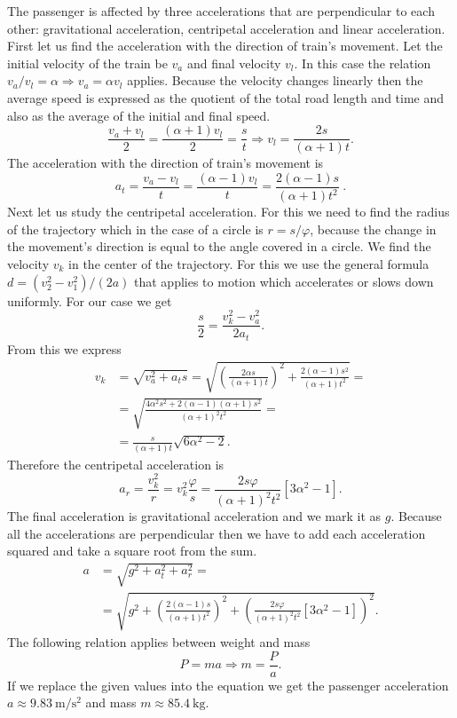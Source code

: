 \documentclass[11pt]{article}
\begin{document}

\solueng
The passenger is affected by three accelerations that are perpendicular to each other: gravitational acceleration, centripetal acceleration and linear acceleration. First let us find the acceleration with the direction of train’s movement. Let the initial velocity of the train be $v_a$ and final velocity $v_l$. In this case the relation $v_a/v_l=\alpha \Rightarrow v_a = \alpha v_l$ applies. Because the velocity changes linearly then the average speed is expressed as the quotient of the total road length and time and also as the average of the initial and final speed. 
\[ \frac{v_a + v_l}{2} = \frac{(\alpha + 1) v_l}{2} = \frac{s}{t} \Rightarrow v_l = \frac{2s}{(\alpha + 1)t}. \] 
The acceleration with the direction of train’s movement is
\[ a_t = \frac{v_a-v_l}{t} = \frac{(\alpha - 1) v_l}{t} = \frac{2(\alpha - 1)s}{(\alpha + 1)t^2} \ . \] 
Next let us study the centripetal acceleration. For this we need to find the radius of the trajectory which in the case of a circle is $r = s/\varphi$, because the change in the movement’s direction is equal to the angle covered in a circle. We find the velocity $v_k$ in the center of the trajectory. For this we use the general formula $d=(v_2^2-v_1^2)/(2a)$ that applies to motion which accelerates or slows down uniformly. For our case we get
\[\frac{s}{2} = \frac{v_k^2 - v_a^2}{2a_t}.\] 
From this we express
\begin{align*}
v_k &= \sqrt{v_a^2+a_t s} = \sqrt{\left(\frac{2\alpha s}{(\alpha+1)t}\right)^2 +\frac{2(\alpha - 1)s^2}{(\alpha+1)t^2}} =\\
&=\sqrt{\frac{4\alpha^2 s^2 + 2(\alpha-1)(\alpha+1)s^2}{(\alpha+1)^2 t^2}} =\\
&=\frac{s}{(\alpha+1)t} \sqrt{6\alpha^2-2}.
\end{align*} 
Therefore the centripetal acceleration is 
\[ a_r = \frac{v_k^2}{r} = v_k^2 \frac{\varphi}{s} = \frac{2s\varphi}{(\alpha+1)^2t^2} [3\alpha^2-1]. \] 
The final acceleration is gravitational acceleration and we mark it as $g$. Because all the accelerations are perpendicular then we have to add each acceleration squared and take a square root from the sum.
\begin{align*}
a &= \sqrt{ g^2 + a_t^2 + a_r^2 } =\\
&= \sqrt{ g^2 + \left(\frac{2(\alpha - 1)s}{(\alpha + 1)t^2}\right)^2 + \left(\frac{2s\varphi}{(\alpha+1)^2t^2} [3\alpha^2-1]\right)^2 }.
\end{align*} 
The following relation applies between weight and mass
\[ P = ma \Rightarrow m = \frac{P}{a}. \] 
If we replace the given values into the equation we get the passenger acceleration $a\approx\SI{9.83}{\meter\per\second\squared}$ and mass $m\approx\SI{85.4}{\kilogram}$.
\probend
\bigskip
\end{document}
